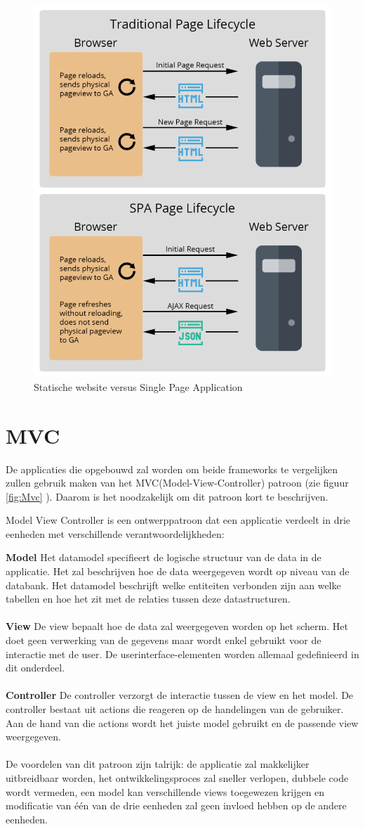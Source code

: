 \begin{figure}[H]
	\centering
	\includegraphics[width=0.5\linewidth]{spa-architecture}
	\caption{Statische website versus Single Page Application \autocite{E-nor2018}}
	\label{fig:SPA}
\end{figure}

\section{MVC}
De applicaties die opgebouwd zal worden om beide frameworks te vergelijken zullen gebruik maken van het MVC(Model-View-Controller) patroon (zie figuur \ref{fig:Mvc} ). Daarom is het noodzakelijk om dit patroon kort te beschrijven.


Model View Controller is een ontwerppatroon dat een applicatie verdeelt in drie eenheden met verschillende verantwoordelijkheden:

	\textbf{Model}  \hspace{1cm} Het datamodel specifieert de logische structuur van de data in de applicatie. Het zal beschrijven hoe de data weergegeven wordt op niveau van de databank. Het datamodel beschrijft welke entiteiten verbonden zijn aan welke tabellen en hoe het zit met de relaties tussen deze datastructuren.   					\\ \\
	\textbf{View} \hspace{1cm} De view bepaalt hoe de data zal weergegeven worden op het scherm. Het doet geen verwerking van de gegevens maar wordt enkel gebruikt voor de interactie met de user. De userinterface-elementen worden allemaal gedefinieerd in dit onderdeel. 						\\	\\
	\textbf{Controller} \hspace{1cm} De controller verzorgt de interactie tussen de view en het model. De controller bestaat uit actions die reageren op de handelingen van de gebruiker. Aan de hand van die actions wordt het juiste model gebruikt en de passende view weergegeven.  			\\	\\
De voordelen van dit patroon zijn talrijk: de applicatie zal makkelijker uitbreidbaar worden, het ontwikkelingsproces zal sneller verlopen, dubbele code wordt vermeden, een model kan verschillende views toegewezen krijgen en modificatie van één van de drie eenheden zal geen invloed hebben op de andere eenheden.

